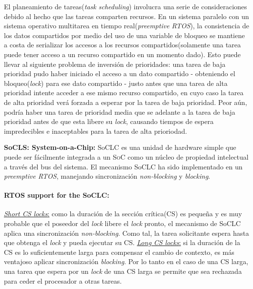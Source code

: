 El planeamiento de tareas(\textit{task scheduling}) involucra una serie de consideraciones debido al hecho que las tareas comparten recursos. En un sistema paralelo con un sistema operativo multitarea en tiempo real(\textit{preemptive RTOS}), la consistencia de los datos compartidos por medio del uso de una variable de bloqueo se mantiene a costa de serializar los accesos a los recursos compartidos(solamente una tarea puede tener acceso a un recurso compartido en un momento dado). Esto puede llevar al siguiente problema de inversión de prioridades: una tarea de baja prioridad pudo haber iniciado el acceso a un dato compartido - obteniendo el bloqueo(\textit{lock}) para ese dato compartido - justo antes que una tarea de alta prioridad intente acceder a ese mismo recurso compartido, en cuyo caso la tarea de alta prioridad verá forzada a esperar por la tarea de baja prioridad. Peor aún, podría haber una tarea de prioridad media que se adelante a la tarea de baja prioridad antes de que esta libere su \textit{lock}, causando tiempos de espera impredecibles e inaceptables para la tarea de alta prioriodad. 

\textbf{SoCLS: System-on-a-Chip:} SoCLC es una unidad de hardware simple que puede ser fácilmente integrada a un \textsc{SoC} como un núcleo de propiedad intelectual a través del bus del sistema. El mecanismo SoCLC ha sido implementado en un \textit{preemptive RTOS}, manejando sincronización \textit{non-blocking} y \textit{blocking}. 

\paragraph{\textnormal{\textbf{RTOS support for the SoCLC:}}} \underline{\textit{Short CS locks}:} como la duración de la sección crítica(CS) es pequeña y es muy probable que el poseedor del \textit{lock} libere el \textit{lock} pronto, el mecanismo de SoCLC aplica una sincronización \textit{non-blocking}. Como tal, la tarea solicitante espera hasta que obtenga el \textit{lock} y pueda ejecutar su CS. \underline{\textit{Long CS locks}:} si la duración de la CS es lo suficientemente larga para compensar el cambio de contexto, es más ventajoso aplicar sincronización \textit{blocking}. Por lo tanto en el caso de una CS larga, una tarea que espera por un \textit{lock} de una CS larga se permite que sea rechazada para ceder el procesador a otras tareas. 

